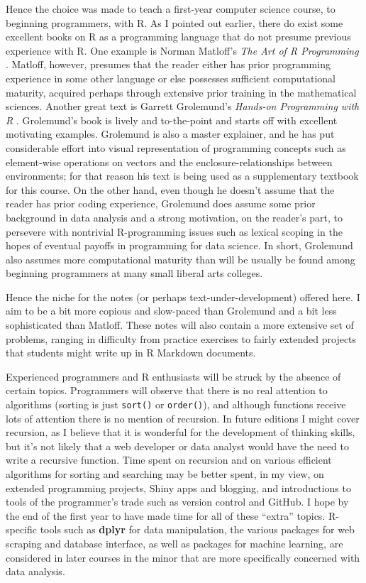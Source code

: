 \documentclass[]{book}
\theoremstyle{definition}
\theoremstyle{definition}
\theoremstyle{definition}
\theoremstyle{remark}
\begin{document}
Hence the choice was made to teach a first-year computer science course,
to beginning programmers, with R. As I pointed out earlier, there do
exist some excellent books on R as a programming language that do not
presume previous experience with R. One example is Norman Matloff's
\emph{The Art of R Programming} \citep{Matloff2011}. Matloff, however,
presumes that the reader either has prior programming experience in some
other language or else possesses sufficient computational maturity,
acquired perhaps through extensive prior training in the mathematical
sciences. Another great text is Garrett Grolemund's \emph{Hands-on
Programming with R} \citep{Grolemund2014}. Grolemund's book is lively
and to-the-point and starts off with excellent motivating examples.
Grolemund is also a master explainer, and he has put considerable effort
into visual representation of programming concepts such as element-wise
operations on vectors and the enclosure-relationships between
environments; for that reason his text is being used as a supplementary
textbook for this course. On the other hand, even though he doesn't
assume that the reader has prior coding experience, Grolemund does
assume some prior background in data analysis and a strong motivation,
on the reader's part, to persevere with nontrivial R-programming issues
such as lexical scoping in the hopes of eventual payoffs in programming
for data science. In short, Grolemund also assumes more computational
maturity than will be usually be found among beginning programmers at
many small liberal arts colleges.

Hence the niche for the notes (or perhaps text-under-development)
offered here. I aim to be a bit more copious and slow-paced than
Grolemund and a bit less sophisticated than Matloff. These notes will
also contain a more extensive set of problems, ranging in difficulty
from practice exercises to fairly extended projects that students might
write up in R Markdown documents.

Experienced programmers and R enthusiasts will be struck by the absence
of certain topics. Programmers will observe that there is no real
attention to algorithms (sorting is just \texttt{sort()} or
\texttt{order()}), and although functions receive lots of attention
there is no mention of recursion. In future editions I might cover
recursion, as I believe that it is wonderful for the development of
thinking skills, but it's not likely that a web developer or data
analyst would have the need to write a recursive function. Time spent on
recursion and on various efficient algorithms for sorting and searching
may be better spent, in my view, on extended programming projects, Shiny
apps and blogging, and introductions to tools of the programmer's trade
such as version control and GitHub. I hope by the end of the first year
to have made time for all of these ``extra'' topics. R-specific tools
such as \textbf{dplyr} for data manipulation, the various packages for
web scraping and database interface, as well as packages for machine
learning, are considered in later courses in the minor that are more
specifically concerned with data analysis.
\end{document}

